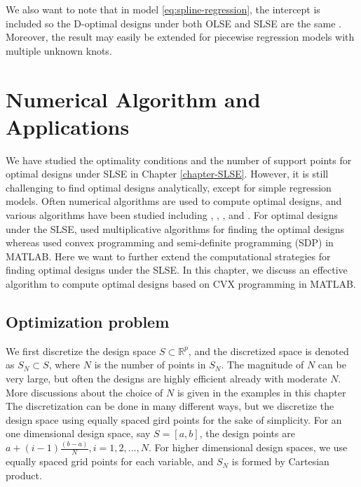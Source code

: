 \documentclass[
]{book}
\theoremstyle{definition}
\theoremstyle{definition}
\theoremstyle{definition}
\theoremstyle{definition}
\theoremstyle{remark}
\begin{document}
We also want to note that in model \eqref{eq:spline-regression}, the intercept is included so the D-optimal designs under both OLSE and SLSE are the same \citep{gao2014new}. Moreover, the result may easily be extended for piecewise regression models with multiple unknown knots.

\chapter{Numerical Algorithm and Applications}\label{chapter-applications}

We have studied the optimality conditions and the number of support points for optimal designs under SLSE in Chapter \ref{chapter-SLSE}. However, it is still challenging to find optimal designs analytically, except for simple regression models. Often numerical algorithms are used to compute optimal designs, and various algorithms have been studied including \citet{titterington1978estimation}, \citet{silvey1978an}, \citet{dette2008improving}, and \citet{torsney2009multiplicative}. For optimal designs under the SLSE, \citet{bose2015optimal} used multiplicative algorithms for finding the optimal designs whereas \citet{gao2017d} used convex programming and semi-definite programming (SDP) in MATLAB. Here we want to further extend the computational strategies for finding optimal designs under the SLSE. In this chapter, we discuss an effective algorithm to compute optimal designs based on CVX programming in MATLAB.

\section{Optimization problem}\label{optimization-problem}

We first discretize the design space \(S \subset \mathbb{R}^p\), and the discretized space is denoted as \(S_N\subset S\), where \(N\) is the number of points in \(S_N\). The magnitude of \(N\) can be very large, but often the designs are highly efficient already with moderate \(N\). More discussions about the choice of \(N\) is given in the examples in this chapter The discretization can be done in many different ways, but we discretize the design space using equally spaced gird points for the sake of simplicity. For an one dimensional design space, say \(S=[a,b]\), the design points are \(a+(i-1)\frac{(b-a)}{N},i=1,2,...,N\). For higher dimensional design spaces, we use equally spaced grid points for each variable, and \(S_N\) is formed by Cartesian product.
\end{document}
